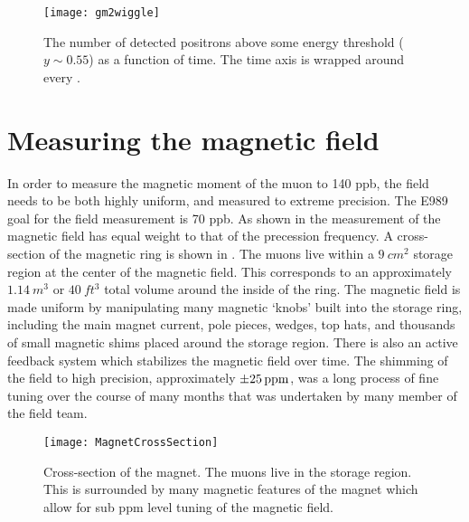 \begin{figure}[]
    \centering
    \texttt{[image: gm2wiggle]}
    \caption[\gmtwo wiggle example]{The number of detected positrons above some energy threshold ($y \sim 0.55$) as a function of time. The time axis is wrapped around every .}
    \label{fig:gm2wiggle}
\end{figure}



\section{Measuring the magnetic field}
\label{sec:BIntro}


In order to measure the magnetic moment of the muon to 140 ppb, the field needs to be both highly uniform, and measured to extreme precision. The E989 goal for the field measurement is 70 ppb. As shown in  the measurement of the magnetic field has equal weight to that of the precession frequency. A cross-section of the magnetic ring is shown in . The muons live within a $\SI{9}{cm^{2}}$ storage region at the center of the magnetic field. This corresponds to an approximately $\SI{1.14}{m^{3}}$ or $\SI{40}{ft^{3}}$ total volume around the inside of the ring. The magnetic field is made uniform by manipulating many magnetic `knobs' built into the \gmtwo storage ring, including the main magnet current, pole pieces, wedges, top hats, and thousands of small magnetic shims placed around the storage region. There is also an active feedback system which stabilizes the magnetic field over time. The shimming of the field to high precision, approximately $\SI{\pm 25}{ppm}$, was a long process of fine tuning over the course of many months that was undertaken by many member of the field team.

\begin{figure}[]
    \centering
    \texttt{[image: MagnetCrossSection]}
    \caption[Magnet cross section]{Cross-section of the \gmtwo magnet. The muons live in the storage region. This is surrounded by many magnetic features of the magnet which allow for sub ppm level tuning of the magnetic field.}
    \label{fig:MagnetCrossSection}
\end{figure}


